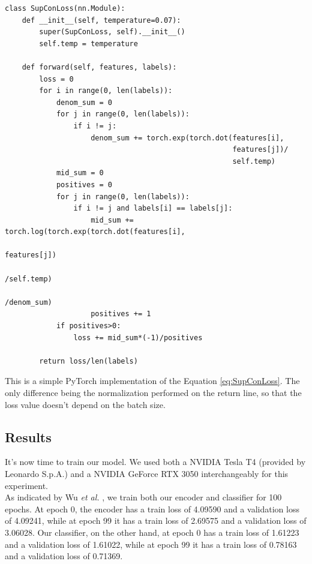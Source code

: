 \begin{lstlisting}[style=mypython, xleftmargin=.03\textwidth, xrightmargin=.03\textwidth]
class SupConLoss(nn.Module):
    def __init__(self, temperature=0.07):
        super(SupConLoss, self).__init__()
        self.temp = temperature

    def forward(self, features, labels):
        loss = 0
        for i in range(0, len(labels)):
            denom_sum = 0
            for j in range(0, len(labels)):
                if i != j:
                    denom_sum += torch.exp(torch.dot(features[i],
                                                     features[j])/
                                                     self.temp)
            mid_sum = 0
            positives = 0
            for j in range(0, len(labels)):
                if i != j and labels[i] == labels[j]:
                    mid_sum += torch.log(torch.exp(torch.dot(features[i],
                                                             features[j])
                                                             /self.temp)
                                                             /denom_sum)
                    positives += 1
            if positives>0:
                loss += mid_sum*(-1)/positives
        
        return loss/len(labels)
\end{lstlisting}

\noindent This is a simple PyTorch implementation of the Equation \ref{eq:SupConLoss}. The only difference being the normalization performed on the return line, so that the loss value doesn't depend on the batch size.

\subsection{Results}
It's now time to train our model. We used both a NVIDIA Tesla T4 (provided by Leonardo S.p.A.) and a NVIDIA GeForce RTX 3050 interchangeably for this experiment. \\
As indicated by Wu \textit{et al.} \cite{wu2022contrastive}, we train both our encoder and classifier for 100 epochs. At epoch 0, the encoder has a train loss of 4.09590 and a validation loss of 4.09241, while at epoch 99 it has a train loss of 2.69575 and a validation loss of 3.06028. Our classifier, on the other hand, at epoch 0 has a train loss of 1.61223 and a validation loss of 1.61022, while at epoch 99 it has a train loss of 0.78163 and a validation loss of 0.71369. \\

